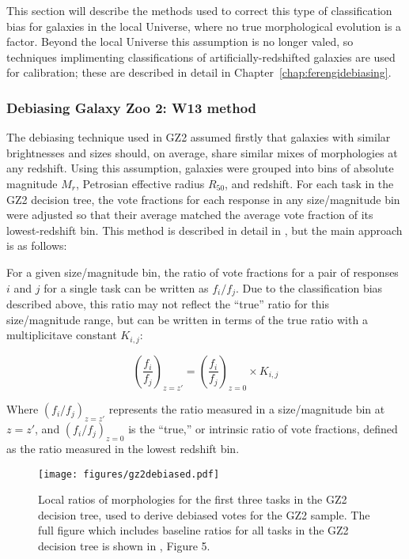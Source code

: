 This section will describe the methods used to correct this type of classification bias for galaxies in the local Universe, where no true morphological evolution is a factor. Beyond the local Universe this assumption is no longer valed, so techniques implimenting classifications of artificially-redshifted galaxies are used for calibration; these are described in detail in Chapter~\ref{chap:ferengidebiasing}. 

\subsubsection{Debiasing Galaxy Zoo 2: W13 method}

The debiasing technique used in GZ2 assumed firstly that galaxies with similar brightnesses and sizes should, on average, share similar mixes of morphologies at any redshift. Using this assumption, galaxies were grouped into bins of absolute magnitude $M_r$, Petrosian effective radius $R_{50}$, and redshift. For each task in the GZ2 decision tree, the vote fractions for each response in any size/magnitude bin were adjusted so that their average matched the average vote fraction of its lowest-redshift bin. This method is described in detail in \citet{Willett2013}, but the main approach is as follows:

For a given size/magnitude bin, the ratio of vote fractions for a pair of responses $i$ and $j$ for a single task can be written as $f_i/f_j$. Due to the classification bias described above, this ratio may not reflect the ``true'' ratio for this size/magnitude range, but can be written in terms of the true ratio with a multiplicitave constant $K_{i,j}$:

\begin{equation}
\left(\frac{f_i}{f_j}\right)_{z=z'} = \left(\frac{f_i}{f_j}\right)_{z=0} \times K_{i,j}
\label{eqn:fvspk}
\end{equation}

Where $(f_i/f_j)_{z=z'}$ represents the ratio measured in a size/magnitude bin at $z=z'$, and $(f_i/f_j)_{z=0}$ is the ``true,'' or intrinsic ratio of vote fractions, defined as the ratio measured in the lowest redshift bin.

\begin{figure}
\centering
\texttt{[image: figures/gz2debiased.pdf]}
\caption{Local ratios of morphologies for the first three tasks in the GZ2 decision tree, used to derive debiased votes for the GZ2 sample. The full figure which includes baseline ratios for all tasks in the GZ2 decision tree is shown in \citet{Willett2013}, Figure 5.}
\label{fig:gz2debiased}
\end{figure} 

